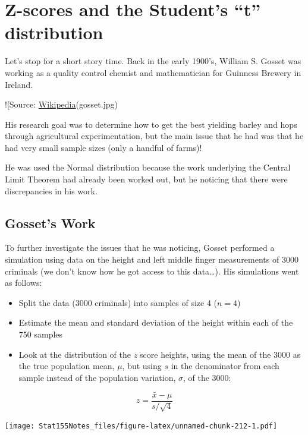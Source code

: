 \documentclass[]{book}
\providecommand{\tightlist}{%
  \setlength{\itemsep}{0pt}\setlength{\parskip}{0pt}}
\begin{document}
\hypertarget{z-scores-and-the-students-t-distribution}{%
\section{Z-scores and the Student's ``t'' distribution}\label{z-scores-and-the-students-t-distribution}}

Let's stop for a short story time. Back in the early 1900's, William S. Gosset was working as a quality control chemist and mathematician for Guinness Brewery in Ireland.

!{[}Source: \href{http://upload.wikimedia.org/wikipedia/commons/thumb/4/42/William_Sealy_Gosset.jpg/240px-William_Sealy_Gosset.jpg}{Wikipedia}(gosset.jpg)

His research goal was to determine how to get the best yielding barley and hops through agricultural experimentation, but the main issue that he had was that he had very small sample sizes (only a handful of farms)!

He was used the Normal distribution because the work underlying the Central Limit Theorem had already been worked out, but he noticing that there were discrepancies in his work.

\hypertarget{gossets-work}{%
\subsection{Gosset's Work}\label{gossets-work}}

To further investigate the issues that he was noticing, Gosset performed a simulation using data on the height and left middle finger measurements of 3000 criminals (we don't know how he got access to this data\ldots{}). His simulations went as follows:

\begin{itemize}
\tightlist
\item
  Split the data (3000 criminals) into samples of size 4 (\(n=4\))
\item
  Estimate the mean and standard deviation of the height within each of the 750 samples
\item
  Look at the distribution of the \emph{z} score heights, using the mean of the 3000 as the true population mean, \(\mu\), but using \(s\) in the denominator from each sample instead of the population variation, \(\sigma\), of the 3000:
\end{itemize}

\[ z = \frac{\bar{x} - \mu}{s/\sqrt{4}}\]

\texttt{[image: Stat155Notes\_files/figure-latex/unnamed-chunk-212-1.pdf]}
\end{document}
